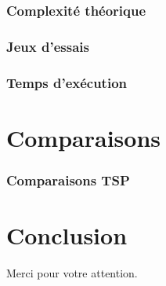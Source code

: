 \documentclass[french]{beamer}
\begin{document}
\begin{frame}
  \frametitle{Complexité théorique}
\end{frame}

\begin{frame}
  \frametitle{Jeux d'essais}
\end{frame}

\begin{frame}
  \frametitle{Temps d'exécution}
\end{frame}

\section{Comparaisons}

\begin{frame}
  \frametitle{Comparaisons TSP}
  
\end{frame}

\section{Conclusion}
\begin{frame}

\end{frame}


\begin{frame}
  \begin{center}
    Merci pour votre attention.
  \end{center}
\end{frame}
\end{document}
